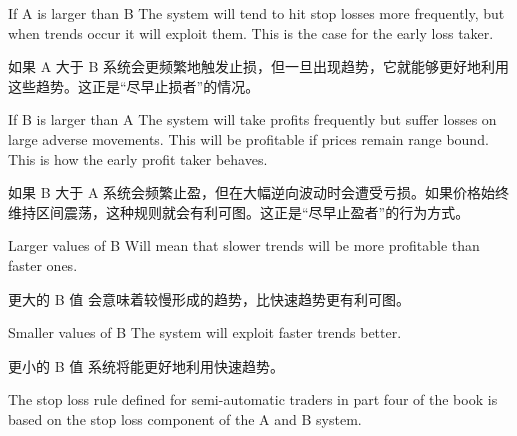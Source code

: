 \bipairgap

\begin{englishblock} If A is larger than B The system will tend to hit stop losses more frequently, but when trends occur it will exploit them. This is the case for the early loss taker. \end{englishblock}

\begin{chineseblock}如果 A 大于 B 系统会更频繁地触发止损，但一旦出现趋势，它就能够更好地利用这些趋势。这正是“尽早止损者”的情况。\end{chineseblock}

\bipairgap

\begin{englishblock} If B is larger than A The system will take profits frequently but suffer losses on large adverse movements. This will be profitable if prices remain range bound. This is how the early profit taker behaves. \end{englishblock}

\begin{chineseblock}如果 B 大于 A 系统会频繁止盈，但在大幅逆向波动时会遭受亏损。如果价格始终维持区间震荡，这种规则就会有利可图。这正是“尽早止盈者”的行为方式。\end{chineseblock}

\bipairgap

\begin{englishblock} Larger values of B Will mean that slower trends will be more profitable than faster ones. \end{englishblock}

\begin{chineseblock}更大的 B 值 会意味着较慢形成的趋势，比快速趋势更有利可图。\end{chineseblock}

\bipairgap

\begin{englishblock} Smaller values of B The system will exploit faster trends better. \end{englishblock}

\begin{chineseblock}更小的 B 值 系统将能更好地利用快速趋势。\end{chineseblock}

\bipairgap

\begin{englishblock} The stop loss rule defined for semi-automatic traders in part four of the book is based on the stop loss component of the A and B system. \end{englishblock}

